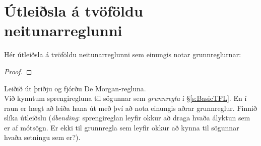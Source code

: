 \section{Útleiðsla á tvöföldu neitunarreglunni}
Hér útleiðsla á tvöföldu neitunarreglunni sem einungis notar grunnreglurnar:
\begin{proof}
	\open
	\close
	\open
	\close
\end{proof}

\practiceproblems

\problempart
Leiðið út þriðju og fjórðu De Morgan-regluna.\\

\problempart
Við kynntum sprengiregluna til sögunnar sem \emph{grunnreglu} í \S\ref{s:BasicTFL}. En í raun er hægt að leiða hana út með því að nota einungis aðrar grunnreglur. Finnið slíka útleiðslu (\emph{ábending}: sprengireglan leyfir okkur að draga hvaða ályktun sem er af mótsögn. Er ekki til grunnregla sem leyfir okkur að kynna til sögunnar hvaða setningu sem er?).
